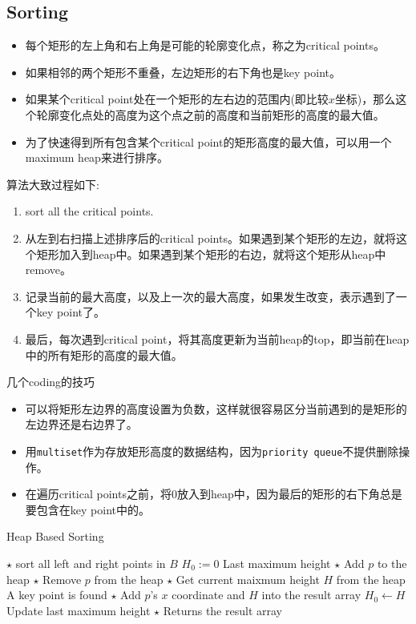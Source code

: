 \subsection{Sorting}
\begin{itemize}
    \item 每个矩形的左上角和右上角是可能的轮廓变化点，称之为critical points。
    \item 如果相邻的两个矩形不重叠，左边矩形的右下角也是key point。
    \item 如果某个critical point处在一个矩形的左右边的范围内(即比较$x$坐标)，那么这个轮廓变化点处的高度为这个点之前的高度和当前矩形的高度的最大值。
    \item 为了快速得到所有包含某个critical point的矩形高度的最大值，可以用一个maximum heap来进行排序。
\end{itemize}
算法大致过程如下:
\begin{enumerate}
    \item sort all the critical points. 
    \item 从左到右扫描上述排序后的critical points。如果遇到某个矩形的左边，就将这个矩形加入到heap中。如果遇到某个矩形的右边，就将这个矩形从heap中remove。
    \item 记录当前的最大高度，以及上一次的最大高度，如果发生改变，表示遇到了一个key point了。
    \item 最后，每次遇到critical point，将其高度更新为当前heap的top，即当前在heap中的所有矩形的高度的最大值。
\end{enumerate}
几个coding的技巧
\begin{itemize}
    \item 可以将矩形左边界的高度设置为负数，这样就很容易区分当前遇到的是矩形的左边界还是右边界了。
    \item 用\texttt{multiset}作为存放矩形高度的数据结构，因为\texttt{priority queue}不提供删除操作。
    \item 在遍历critical points之前，将0放入到heap中，因为最后的矩形的右下角总是要包含在key point中的。
\end{itemize}
\setcounter{algorithm}{0}
\begin{algorithm}[H]
\caption{Heap Based Sorting}
\begin{algorithmic}[1]
\State $\star$ sort all left and right points in $B$
\State $H_0:=0$ \Comment Last maximum height
\State $\star$ Add $p$ to the heap
\Else
\State $\star$ Remove $p$ from the heap
\EndIf
\State $\star$ Get current maixmum height $H$ from the heap
 \Comment A key point is found
\State $\star$ Add $p$'s $x$ coordinate and $H$ into the result array
\State $H_0\gets H$ \Comment Update last maximum height
\EndIf
\EndFor
\State $\star$ Returns the result array
\EndProcedure
\end{algorithmic}
\end{algorithm}
